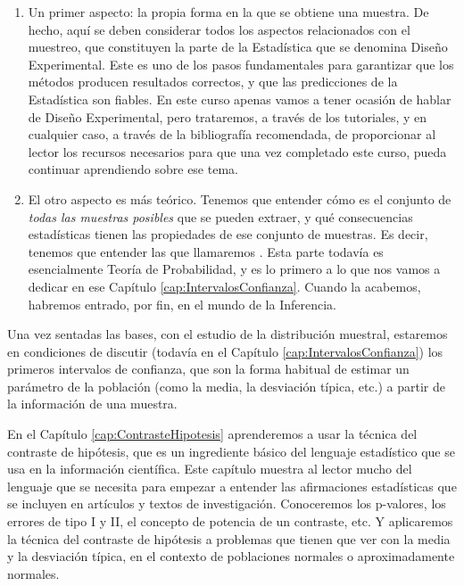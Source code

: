 \begin{enumerate}
\item Un primer aspecto: la propia forma en la que se obtiene una muestra. De hecho, aquí se deben considerar todos los aspectos relacionados con el muestreo, que constituyen la parte de la Estadística que se denomina {\sf Diseño Experimental}. Este es uno de los pasos fundamentales para garantizar que los métodos producen resultados correctos, y que las predicciones de la Estadística son fiables. En este curso apenas vamos a tener ocasión de hablar de Diseño Experimental, pero trataremos, a través de los tutoriales, y en cualquier caso, a través de la bibliografía recomendada, de proporcionar al lector los recursos necesarios para que una vez completado este curso, pueda continuar aprendiendo sobre ese tema.
\item El otro aspecto es más teórico. Tenemos que entender cómo es el conjunto de {\em todas las muestras posibles} que se pueden extraer, y qué consecuencias estadísticas tienen las propiedades de ese conjunto de muestras. Es decir, tenemos que entender las que llamaremos . Esta parte todavía es esencialmente Teoría de Probabilidad, y es lo primero a lo que nos vamos a dedicar en ese Capítulo \ref{cap:IntervalosConfianza}. Cuando la acabemos, habremos entrado, por fin, en el mundo de la Inferencia.
\end{enumerate}

Una vez sentadas las bases, con el estudio de la distribución muestral, estaremos en condiciones de discutir (todavía en el Capítulo \ref{cap:IntervalosConfianza}) los primeros {\sf intervalos de confianza}, que son la forma habitual de estimar un parámetro de la población (como la media, la desviación típica, etc.) a partir de la información de una muestra.

En el Capítulo \ref{cap:ContrasteHipotesis} aprenderemos a usar la técnica del {\sf contraste de hipótesis}, que es un ingrediente básico del lenguaje estadístico que se usa en la información científica. Este capítulo muestra al lector mucho del lenguaje que se necesita para empezar a entender las afirmaciones estadísticas que se incluyen en artículos y textos de investigación. Conoceremos los p-valores, los errores de tipo I y II, el concepto de potencia de un contraste, etc. Y aplicaremos la técnica del contraste de hipótesis a problemas que tienen que ver con la media y la desviación típica, en el contexto de poblaciones normales o aproximadamente normales.

